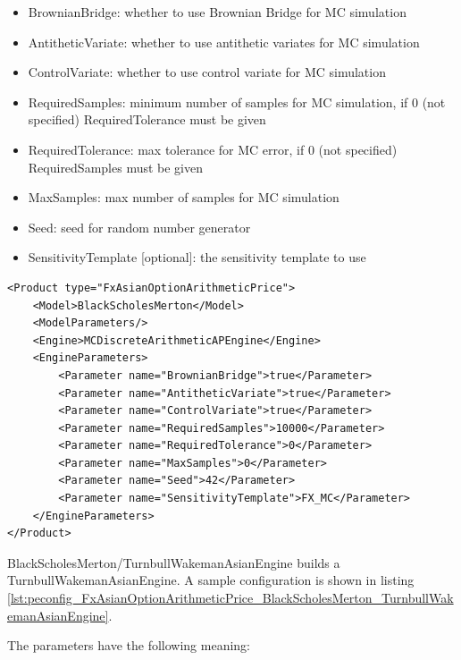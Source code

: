 \begin{itemize}
\item BrownianBridge: whether to use Brownian Bridge for MC simulation
\item AntitheticVariate: whether to use antithetic variates for MC simulation
\item ControlVariate: whether to use control variate for MC simulation
\item RequiredSamples: minimum number of samples for MC simulation, if 0 (not specified) RequiredTolerance must be given
\item RequiredTolerance: max tolerance for MC error, if 0 (not specified) RequiredSamples must be given
\item MaxSamples: max number of samples for MC simulation
\item Seed: seed for random number generator
\item SensitivityTemplate [optional]: the sensitivity template to use
\end{itemize}

\begin{longlisting}
\begin{verbatim}
<Product type="FxAsianOptionArithmeticPrice">
    <Model>BlackScholesMerton</Model>
    <ModelParameters/>
    <Engine>MCDiscreteArithmeticAPEngine</Engine>
    <EngineParameters>
        <Parameter name="BrownianBridge">true</Parameter>
        <Parameter name="AntitheticVariate">true</Parameter>
        <Parameter name="ControlVariate">true</Parameter>
        <Parameter name="RequiredSamples">10000</Parameter>
        <Parameter name="RequiredTolerance">0</Parameter>
        <Parameter name="MaxSamples">0</Parameter>
        <Parameter name="Seed">42</Parameter>
        <Parameter name="SensitivityTemplate">FX_MC</Parameter>
    </EngineParameters>
</Product>
\end{verbatim}
\caption{Configuration for Product FxAsianOptionArithmeticPrice, Model BlackScholesMerton, Engine MCDiscreteArithmeticAPEngine}
\label{lst:peconfig_FxAsianOptionArithmeticPrice_BlackScholesMerton_MCDiscreteArithmeticAPEngine}
\end{longlisting}

BlackScholesMerton/TurnbullWakemanAsianEngine builds a TurnbullWakemanAsianEngine. A sample configuration is shown in
listing \ref{lst:peconfig_FxAsianOptionArithmeticPrice_BlackScholesMerton_TurnbullWakemanAsianEngine}.

The parameters have the following meaning:

